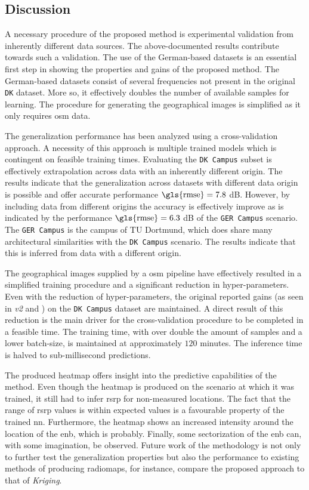 \subsection{Discussion}

A necessary procedure of the proposed method is experimental validation from inherently different data sources. The above-documented results contribute towards such a validation. The use of the German-based datasets is an essential first step in showing the properties and gains of the proposed method. The German-based datasets consist of several frequencies not present in the original \texttt{DK} dataset. More so, it effectively doubles the number of available samples for learning. The procedure for generating the geographical images is simplified as it only requires \gls{osm} data. 

The generalization performance has been analyzed using a cross-validation approach. A necessity of this approach is multiple trained models which is contingent on feasible training times. Evaluating the \texttt{DK Campus} subset is effectively extrapolation across data with an inherently different origin. The results indicate that the generalization across datasets with different data origin is possible and offer accurate performance $\text{\gls{rmse}} = 7.8$ dB. However, by including data from different origins the accuracy is effectively improve as is indicated by the performance $\text{\gls{rmse}} = 6.3$ dB of the \texttt{GER Campus} scenario. The  \texttt{GER Campus} is the campus of TU Dortmund, which does share many architectural similarities with the \texttt{DK Campus} scenario. The results indicate that this is inferred from data with a different origin. 

The geographical images supplied by a \gls{osm} pipeline have effectively resulted in a simplified training procedure and a significant reduction in hyper-parameters. Even with the reduction of hyper-parameters, the original reported gains (as seen in \emph{v2} and \cite{Thrane020ModelAidedDeepLearning}) on the \texttt{DK Campus} dataset are maintained. A direct result of this reduction is the main driver for the cross-validation procedure to be completed in a feasible time. The training time, with over double the amount of samples and a lower batch-size, is maintained at approximately $120$ minutes. The inference time is halved to sub-millisecond predictions.

The produced heatmap offers insight into the predictive capabilities of the method. Even though the heatmap is produced on the scenario at which it was trained, it still had to infer \gls{rsrp} for non-measured locations. The fact that the range of \gls{rsrp} values is within expected values is a favourable property of the trained \gls{nn}. Furthermore, the heatmap shows an increased intensity around the location of the \gls{enb}, which is probably. Finally, some sectorization of the \gls{enb} can, with some imagination, be observed. Future work of the methodology is not only to further test the generalization properties but also the performance to existing methods of producing radiomaps, for instance, compare the proposed approach to that of \emph{Kriging}.

